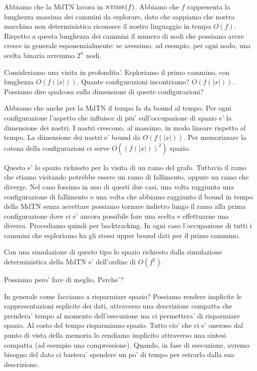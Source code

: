 Abbiamo che la MdTN lavora in $\textsc{ntime}(f)$. Abbiamo che $f$ rappresenta la lunghezza massima dei
cammini da esplorare, dato che sappiamo che nostra macchina non deterministica riconosce il nostro
linguaggio in tempo $O(f)$. Rispetto a questa lunghezza dei cammini il numero di nodi che possiamo
avere cresce in generale esponenzialmente: se avessimo, ad esempio, per ogni nodo, una scelta
binaria avremmo $2^{n}$ nodi.

Consideriamo una visita in profondita'. Esploriamo il primo cammino, con lunghezza $O(f(|x|))$.
Quante configurazioni incontriamo? $O(f(|x|))$. Possiamo dire qualcosa sulla dimensione di queste
configurazioni? 

Abbiamo che anche per la MdTN il tempo fa da bound al tempo. Per ogni configurazione l'aspetto che
influisce di piu' sull'occupazione di spazio e' la dimensione dei nastri. I nastri crescono, al
massimo, in modo lineare rispetto al tempo. La dimensione dei nastri e' bound da $O(f(|x|))$. Per
memorizzare la catena della configurazioni ci serve $O((f(|x|))^{2})$ spazio. 

Questo e' lo spazio richiesto per la visita di un ramo del grafo. Tuttavia il ramo che stiamo
visitando potrebbe essere un ramo di fallimento, oppure un ramo che diverge. Nel caso fossimo in uno
di questi due casi, una volta raggiunta una configurazione di fallimento o una volta che abbiamo
raggiunto il bound in tempo della MdTN senza accettare possiamo tornare indietro lungo il ramo alla
prima configurazione dove ci e' ancora possibile fare una scelta e effettuarne una diversa.
Procediamo quindi per backtracking. In ogni caso l'occupazione di tutti i cammini che esploriamo ha
gli stessi upper bound dati per il primo cammino.

Con una simulazione di questo tipo lo spazio richiesto dalla simulazione deterministica della MdTN
e' dell'ordine di $O(f^{2})$.

Possiamo pero' fare di meglio. Perche'?

In generale come facciamo a risparmiare spazio? Possiamo rendere implicite le rappresentazioni
esplicite dei dati, attraverso una descrizione compatta che prendera' tempo al momento
dell'esecuzione ma ci permettera' di risparmiare spazio. Al costo del tempo risparmiamo spazio.
Tutto cio' che ci e' oneroso dal punto di vista della memoria lo rendiamo implicito attraverso una
sintesi compatta (ad esempio una compressione). Quando, in fase di esecuzione, avremo bisogno del
dato ci bastera' spendere un po' di tempo per estrarlo dalla sua descrizione.

